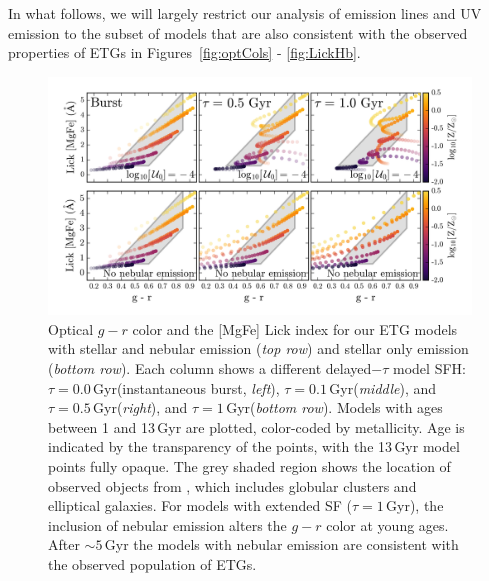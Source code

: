 \documentclass[preprint2]{aastex62}
\newcommand{\Gyr}{$\,$Gyr\xspace}
\begin{document}
In what follows, we will largely restrict our analysis of emission lines and UV emission to the subset of models that are also consistent with the observed properties of ETGs in Figures~\ref{fig:optCols} - \ref{fig:LickHb}.

\begin{figure}
  \begin{center}
    \includegraphics[width=\linewidth]{figs/f10.png}
    \caption{Optical $g-r$ color and the [MgFe] Lick index for our ETG models with stellar and nebular emission (\emph{top row}) and stellar only emission (\emph{bottom row}). Each column shows a different delayed$-\tau$ model SFH: $\tau=0.0$\Gyr (instantaneous burst, \emph{left}), $\tau=0.1$\Gyr (\emph{middle}), and $\tau=0.5$\Gyr (\emph{right}), and $\tau=1$\Gyr (\emph{bottom row}). Models with ages between 1 and 13\Gyr are plotted, color-coded by metallicity. Age is indicated by the transparency of the points, with the 13\Gyr model points fully opaque. The grey shaded region shows the location of observed objects from \citet{Schombert+2016}, which includes globular clusters and elliptical galaxies. For models with extended SF ($\tau=1$\Gyr), the inclusion of nebular emission alters the $g-r$ color at young ages. After $\sim5$\Gyr the models with nebular emission are consistent with the observed population of ETGs.
    }
    \label{fig:LickMgFe}
  \end{center}
\end{figure}
\end{document}
